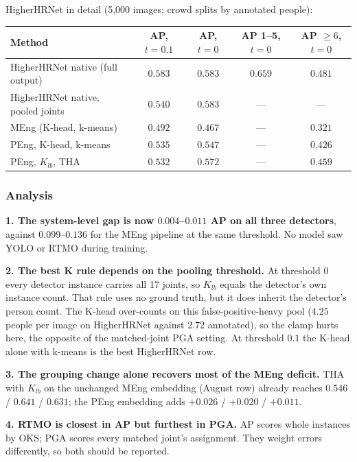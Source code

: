 HigherHRNet in detail (5,000 images; crowd splits by annotated people):

\begin{tabular}{lcccc}
\hline
\textbf{Method} & \textbf{AP, $t{=}0.1$} & \textbf{AP, $t{=}0$} & \textbf{AP 1--5, $t{=}0$} & \textbf{AP $\geq 6$, $t{=}0$} \\
\hline
HigherHRNet native (full output)        & $0.583$ & $0.583$ & $0.659$ & $0.481$ \\
HigherHRNet native, pooled joints       & $0.540$ & $0.583$ & ---     & ---     \\
MEng (K-head, k-means)                  & $0.492$ & $0.467$ & ---     & $0.321$ \\
PEng, K-head, k-means                   & $\mathbf{0.535}$ & $0.547$ & --- & $0.426$ \\
PEng, $K_{lb}$, THA                     & $0.532$ & $\mathbf{0.572}$ & --- & $\mathbf{0.459}$ \\
\hline
\end{tabular}

\subsubsection{Analysis}

\textbf{1. The system-level gap is now $0.004$--$0.011$ AP on all three detectors}, against $0.099$--$0.136$ for the MEng pipeline at the same threshold. No model saw YOLO or RTMO during training.

\textbf{2. The best K rule depends on the pooling threshold.} At threshold 0 every detector instance carries all 17 joints, so $K_{lb}$ equals the detector's own instance count. That rule uses no ground truth, but it does inherit the detector's person count. The K-head over-counts on this false-positive-heavy pool ($4.25$ people per image on HigherHRNet against $2.72$ annotated), so the clamp hurts here, the opposite of the matched-joint PGA setting. At threshold $0.1$ the K-head alone with k-means is the best HigherHRNet row.

\textbf{3. The grouping change alone recovers most of the MEng deficit.} THA with $K_{lb}$ on the unchanged MEng embedding (August row) already reaches $0.546$ / $0.641$ / $0.631$; the PEng embedding adds $+0.026$ / $+0.020$ / $+0.011$.

\textbf{4. RTMO is closest in AP but furthest in PGA.} AP scores whole instances by OKS; PGA scores every matched joint's assignment. They weight errors differently, so both should be reported.

